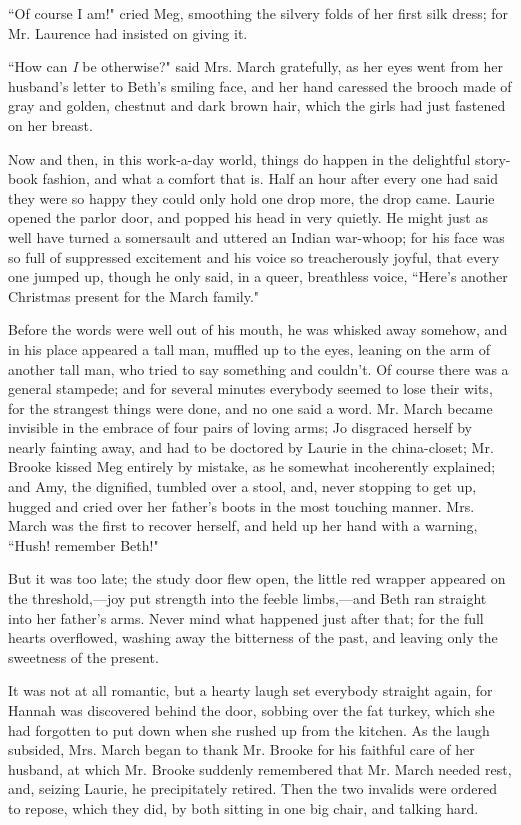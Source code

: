 ``Of course I am!" cried Meg, smoothing the silvery folds of her first
silk dress; for Mr. Laurence had insisted on giving it.

``How can \emph{I} be otherwise?" said Mrs. March gratefully, as her eyes
went from her husband's letter to Beth's
smiling face, and her hand caressed the brooch made of gray and golden,
chestnut and dark brown hair, which the girls had just fastened on her
breast.

Now and then, in this work-a-day world, things do happen in the
delightful story-book fashion, and what a comfort that is. Half an hour
after every one had said they were so happy they could only hold one
drop more, the drop came. Laurie opened the parlor door, and popped his
head in very quietly. He might just as well have turned a somersault and
uttered an Indian war-whoop; for his face was so full of suppressed
excitement and his voice so treacherously joyful, that every one jumped
up, though he only said, in a queer, breathless voice,
``Here's another Christmas present for the March family."

Before the words were well out of his mouth, he was whisked away
somehow, and in his place appeared a tall man, muffled up to the eyes,
leaning on the arm of another tall man, who tried to say something and
couldn't. Of course there was a general stampede; and
for several minutes everybody seemed to lose their wits, for the
strangest things were done, and no one said a word. Mr. March became
invisible in the embrace of four pairs of loving arms; Jo disgraced
herself by nearly fainting away, and had to be doctored by Laurie in the
china-closet; Mr. Brooke kissed Meg entirely by mistake, as he somewhat
incoherently explained; and Amy, the dignified, tumbled over a stool,
and, never stopping to get up, hugged and cried over her
father's boots in the most touching manner. Mrs. March
was the first to recover herself, and held up her hand with a warning,
``Hush! remember Beth!"

But it was too late; the study door flew open, the little red wrapper
appeared on the threshold,---joy put strength into the feeble
limbs,---and Beth ran straight into her father's arms.
Never mind what happened just after that; for the full hearts
overflowed, washing away the bitterness of the past, and leaving only
the sweetness of the present.

It was not at all romantic, but a hearty laugh set everybody straight
again, for Hannah was discovered behind the door, sobbing over the fat
turkey, which she had forgotten to put down when she rushed up from the
kitchen. As the laugh subsided, Mrs. March began to thank Mr. Brooke for
his faithful care of her husband, at which Mr. Brooke suddenly
remembered that Mr. March needed rest, and, seizing Laurie, he
precipitately retired. Then the two invalids were ordered to repose,
which they did, by both sitting in one big chair, and talking hard.

